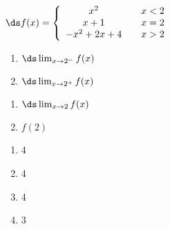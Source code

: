 {$\ds f(x) = \left\{\begin{array}{ccc}
	x^2 & & x<2 \\
	x+1  & & x=2\\
	-x^2+2x+4 & & x>2
	\end{array}
	\right.
$

\noindent\begin{minipage}[t]{.49\linewidth}
\begin{enumerate}
\item		$\ds \lim_{x\to 2^-} f(x)$
\item		$\ds \lim_{x\to 2^+} f(x)$
\end{enumerate}
\end{minipage}
\noindent\begin{minipage}[t]{.49\linewidth}
\begin{enumerate}\addtocounter{enumii}{2}
\item		$\ds \lim_{x\to 2} f(x)$
\item		$f(2)$
\end{enumerate}
\end{minipage}
}
{\begin{enumerate}
\item		4
\item		4
\item		4
\item	  3
\end{enumerate}
}


